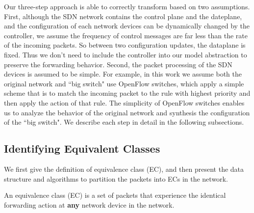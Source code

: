 Our three-step approach is able to correctly transform based on two assumptions. First, although the SDN network contains the control plane and the dateplane, and the configuration of each network devices can be dynamically changed by the controller, we assume the frequency of control messages are far less than the rate of the incoming packets. So between two configuration updates, the dataplane is fixed. Thus we don't need to include the controller into our model abstraction to preserve the forwarding behavior. Second, the packet processing of the SDN devices is assumed to be simple. For example, in this work we assume both the original network and ``big switch" use OpenFlow switches, which apply a simple scheme that is to match the incoming packet to the rule with highest priority and then apply the action of that rule. The simplicity of OpenFlow switches enables us to analyze the behavior of the original network and synthesis the configuration of the ``big switch". We describe each step in detail in the following subsections.
   
\subsection{Identifying Equivalent Classes}

We first give the definition of equivalence class (EC), and then present the data structure and algorithms to partition the packets into ECs in the network.

\begin{definition}
An equivalence class (EC) is a set of packets that experience the identical forwarding action at \textbf{any} network device in the network. 
\label{Def:EC}
\end{definition}

